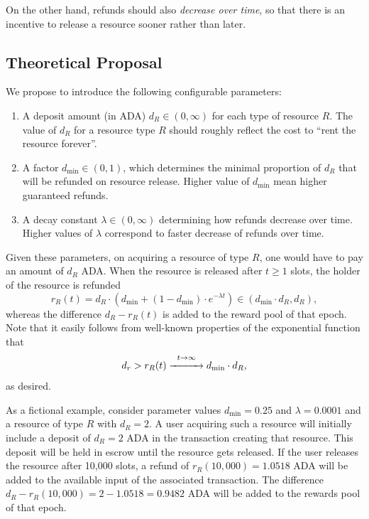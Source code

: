 \documentclass[11pt,a4paper]{article}
\begin{document}
On the other hand, refunds should also \emph{decrease over time}, so that
there is an incentive to release a resource sooner rather than later.

\subsection{Theoretical Proposal}

We propose to introduce the following configurable parameters:
\begin{enumerate}
    \item
        A deposit amount (in ADA) $d_R\in(0,\infty)$ for each type of resource
        $R$. The value of $d_R$ for a resource type $R$ should roughly reflect
        the cost to ``rent the resource forever''.
    \item
        A factor $d_{\min}\in(0,1)$, which determines the minimal proportion of
        $d_R$ that will be refunded on resource release. Higher value of
        $d_{\min}$ mean higher guaranteed refunds.
    \item
        A decay constant $\lambda\in(0,\infty)$ determining how refunds decrease
        over time. Higher values of $\lambda$ correspond to faster decrease of
        refunds over time.
\end{enumerate}

Given these parameters, on acquiring a resource of type $R$, one would have to
pay an amount of $d_R$ ADA\@. When the resource is released after $t\geq 1$ slots,
the holder of the resource is refunded
\[
    r_R(t)=d_R\cdot\left(d_{\min}+(1-d_{\min})\cdot e^{-\lambda t}\right)\in(d_{\min}\cdot d_R,d_R),
\]
whereas the difference $d_R-r_R(t)$ is added to the reward pool of
that epoch.
Note that it easily follows from well-known properties of the exponential
function that
\[
    d_r>r_R(t)\stackrel{t\rightarrow\infty}{\xrightarrow{\hspace{10mm}}}d_{\min}\cdot d_R,
\]
as desired.

As a fictional example, consider parameter values $d_{\min}=0.25$ and $\lambda=0.0001$
and a resource of type $R$ with $d_R=2$. A user acquiring such a resource
will initially include a deposit of $d_R=2$ ADA in the transaction creating that
resource. This deposit will be held in escrow until the resource gets released.
If the user releases the resource after 10,000 slots, a refund of
$r_R(10,000)=1.0518$ ADA will be added to the available input of the associated
transaction. The difference $d_R-r_R(10,000)=2-1.0518=0.9482$ ADA will be added
to the rewards pool of that epoch.
\end{document}
